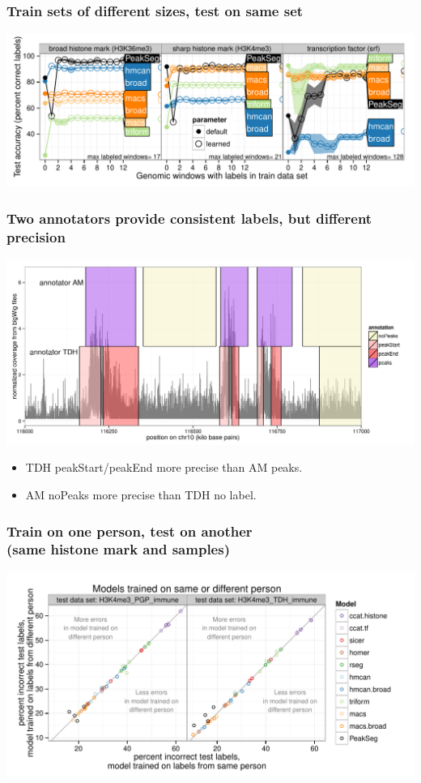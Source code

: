 \documentclass{beamer}
\begin{document}
\begin{frame}
  \frametitle{Train sets of different sizes, test on same set}
  \includegraphics[width=1.1\textwidth]{figure-test-error-decreases-mean.pdf}
\end{frame}

\begin{frame}
  \frametitle{Two annotators provide consistent labels, but different
    precision}
  \includegraphics[width=1.1\textwidth]{screenshot-several-annotators}

  \begin{itemize}
  \item TDH peakStart/peakEnd more precise than AM peaks.
  \item AM noPeaks more precise than TDH no label.
  \end{itemize}
\end{frame}

\begin{frame}
  \frametitle{Train on one person, test on another\\
(same histone mark and samples)}
  \includegraphics[width=1.1\textwidth]{figure-test-H3K4me3-annotators.pdf}
\end{frame}
\end{document}
